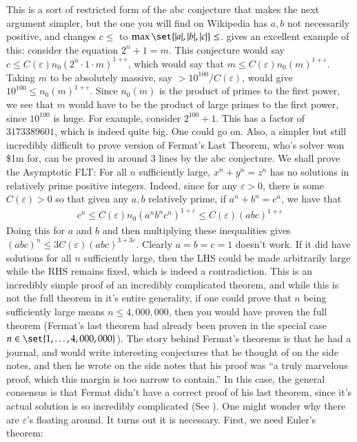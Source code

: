 \documentclass[12pt]{article}
\theoremstyle{definitionstyle}
\def \ve{\varepsilon}
\begin{document}
This is a sort of restricted form of the abc conjecture that makes the next argument simpler, but the one you will find on Wikipedia has $a, b$ not necessarily positive, and changes $c \leq$ to $\max\set{|a|, |b|, |c|} \leq$.  \cite{lang2005algebra} gives an excellent example of this: consider the equation $2^n + 1 = m$. This conjecture would say $c \leq C(\ve) n_0(2^n \cdot 1 \cdot m)^{1+\ve}$, which would say that $m \leq C(\ve)n_0(m)^{1+\ve}$. Taking $m$ to be absolutely massive, say $> 10^{100}/C(\ve)$, would give $10^{100} \leq n_0(m)^{1+\ve}$. Since $n_0(m)$ is the product of primes to the first power, we see that $m$ would have to be the product of large primes to the first power, since $10^{100}$ is huge. For example, consider $2^{100} + 1$. This has a factor of $3173389601$, which is indeed quite big. One could go on. Also, a simpler but still incredibly difficult to prove version of Fermat's Last Theorem, who's solver won \$1m for, can be proved in around 3 lines by the abc conjecture. We shall prove the Asymptotic FLT: For all $n$ sufficiently large, $x^n+y^n=z^n$ has no solutions in relatively prime positive integers. Indeed, since for any $\ve > 0$, there is some $C(\ve) > 0$ so that given any $a, b$ relatively prime, if $a^n+b^n = c^n$, we have that
\begin{align*}
	c^n \leq C(\ve)n_0(a^nb^nc^n)^{1+\ve} \leq C(\ve)(abc)^{1+\ve}
\end{align*}
Doing this for $a$ and $b$ and then multiplying these inequalities gives $(abc)^n \leq 3C(\ve)(abc)^{3+3\ve}$. Clearly $a = b = c = 1$ doesn't work. If it did have solutions for all $n$ sufficiently large, then the LHS could be made arbitrarily large while the RHS remains fixed, which is indeed a contradiction. This is an incredibly simple proof of an incredibly complicated theorem, and while this is not the full theorem in it's entire generality, if one could prove that $n$ being sufficiently large means $n \leq 4,000,000$, then you would have proven the full theorem (Fermat's last theorem had already been proven in the special case $n \in \set{1, \ldots, 4,000,000}$). The story behind Fermat's theorems is that he had a journal, and would write interesting conjectures that he thought of on the side notes, and then he wrote on the side notes that his proof was ``a truly marvelous proof, which this margin is too narrow to contain.'' In this case, the general consensus is that Fermat didn't have a correct proof of his last theorem, since it's actual solution is so incredibly complicated (See \cite{FLT}). One might wonder why there are $\ve$'s floating around. It turns out it is necessary. First, we need Euler's theorem:
\end{document}
